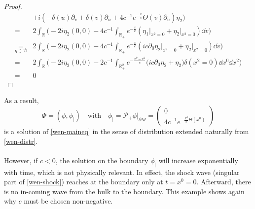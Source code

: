 \begin{proof}
\begin{equation*}
\begin{split}
&+ i (-\delta(u)\partial_v + \delta(v)\partial_u+4c^{-1}e^{-\frac{v}{c}}\Theta(v)\partial_u)\eta_2
\Big)\\ 
%
=& 2\int_{\mathbb{R}}\Big( -2i\eta_2 (0,0) - 4c^{-1}\int_{\mathbb{R}_+}e^{-\frac v c }(\eta_1\vert_{x^2 = 0} +\eta_2\vert_{x^2 = 0}) \dd v\Big) \\ 
%
\underset{\eta\in \mathcal{D}} =& 2\int_{\mathbb{R}}\Big( -2i\eta_2 (0,0) - 4c^{-1}\int_{\mathbb{R}_+}e^{-\frac v c }(ic \partial_0\eta_2\vert_{x^2 = 0} +\eta_2\vert_{x^2 = 0}) \dd v\Big) \\ 
% 
=& 2\int_{\mathbb{R}}\Big( -2i\eta_2 (0,0) - 2c^{-1}\int_{\mathbb{R}^2_+}e^{-\frac{x^0-x^2} {c} }\big(ic \partial_0\eta_2 +\eta_2\big)\delta(x^2 = 0) \dd x^0 \dd x^2\Big) \\ 
=& 0
\end{split}
\end{equation*}
\end{proof}
As a result, 
\begin{equation*}\Phi = (\phi, \phi_|) \quad \mathrm{with}\quad \phi_| = \mathcal{P}_+ \phi\vert_{\partial M} = 
\begin{pmatrix} 0 \\ 4c^{-1}e^{- \frac{x^0}{c} \Theta(x^0)} \end{pmatrix}
\end{equation*}
 is a solution of \cref{wen-maineq} in the sense of distribution extended naturally from \cref{wen-distr}. \\\\
However, if $c<0$, the solution on the boundary $\phi_|$ will increase exponentially with time, which is not physically relevant. 
In effect, the shock wave (singular part of \cref{wen-shock}) reaches at the boundary only at $t = x^0 = 0$.
Afterward, there is no in-coming wave from the bulk to the boundary. 
This example shows again why $c$ must be chosen non-negative.












